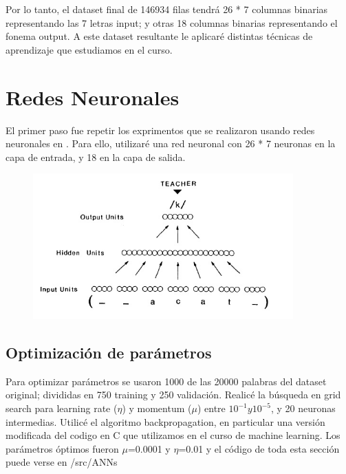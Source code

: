 \documentclass[paper=a4, fontsize=11pt]{scrartcl} %
\numberwithin{equation}{section} %
\numberwithin{figure}{section} %
\numberwithin{table}{section} %
\begin{document}
Por lo tanto, el dataset final de 146934 filas tendrá 26 * 7 columnas binarias representando las 7 letras input; y otras 18 columnas binarias representando el fonema output. A este dataset resultante le aplicaré distintas técnicas de aprendizaje que estudiamos en el curso.

\section{Redes Neuronales}
El primer paso fue repetir los exprimentos que se realizaron usando redes neuronales en \cite{parallel}. Para ello, utilizaré una red neuronal con 26 * 7 neuronas en la capa de entrada, y 18 en la capa de salida. 

\begin{figure}[h!]
\centering
\includegraphics[width=100mm]{imgs/figure1.jpg}
\end{figure}

\subsection{Optimización de parámetros}

Para optimizar parámetros se usaron 1000 de las 20000 palabras del dataset original; divididas en 750 training y 250 validación. Realicé la búsqueda en grid search para learning rate ($\eta$) y momentum ($\mu$) entre  $10^{-1} y 10^{-5}$, y 20 neuronas intermedias. Utilicé el algoritmo backpropagation, en particular una versión modificada del codigo en C que utilizamos en el curso de machine learning. Los parámetros óptimos fueron $\mu$=0.0001 y $\eta$=0.01 y el código de toda esta sección puede verse en /src/ANNs

\end{document}
